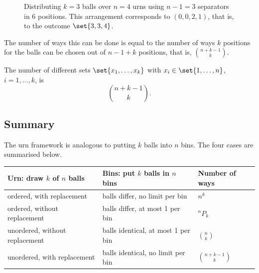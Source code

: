 \begin{figure}[ht]
\centering
{}
\caption{Distributing $k = 3$ balls over $n = 4$ urns using $n - 1 = 3$ separators in $6$ positions. This arrangement corresponds to $(0, 0, 2, 1)$, that is, to the outcome $\set{3, 3, 4}$.}
\label{fig:separators}
\end{figure}

The number of ways this can be done is equal to the number of ways $k$ positions for the balls can be chosen out of $n - 1 + k$ positions, that is, $\binom{n+k-1}{k}$.

\begin{theorem}\label{thm:count-unordered-with-replacement}
The number of different sets $\set{x_1, \ldots, x_k}$ with $x_i \in \set{1, \ldots, n}$, $i = 1, \ldots, k$, is
\[
  \binom{n + k - 1}{k}.
\]
\end{theorem}

\subsection{Summary}\label{sec:counting-summary}

The urn framework is analogous to putting $k$ balls into $n$ bins. The four cases are summarised below.
\begin{center}
\begin{tabular}{@{}lll@{}}
\toprule
Urn: draw $k$ of $n$ balls & Bins: put $k$ balls in $n$ bins & Number of ways \\
\midrule
ordered, with replacement & balls differ, no limit per bin & $n^k$ \\
ordered, without replacement & balls differ, at most 1 per bin & ${}^nP_k$ \\
unordered, without replacement & balls identical, at most 1 per bin & $\binom{n}{k}$ \\
unordered, with replacement & balls identical, no limit per bin & $\binom{n+k-1}{k}$ \\
\bottomrule
\end{tabular}
\end{center}

